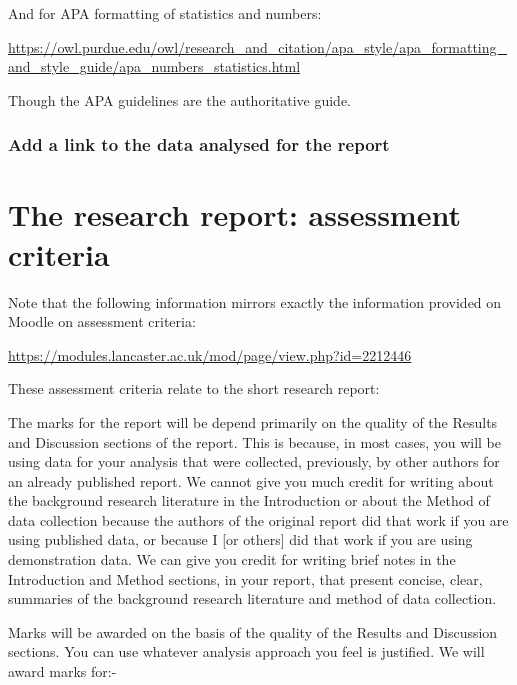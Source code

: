 \documentclass[
  letterpaper,
  DIV=11,
  numbers=noendperiod]{scrreprt}
\begin{document}
And for APA formatting of statistics and numbers:

\url{https://owl.purdue.edu/owl/research_and_citation/apa_style/apa_formatting_and_style_guide/apa_numbers_statistics.html}

Though the APA guidelines are the authoritative guide.

\hypertarget{what-link}{%
\subsubsection{Add a link to the data analysed for the
report}\label{what-link}}

\hypertarget{sec-marking}{%
\section{The research report: assessment criteria}\label{sec-marking}}

Note that the following information mirrors exactly the information
provided on Moodle on assessment criteria:

\url{https://modules.lancaster.ac.uk/mod/page/view.php?id=2212446}

These assessment criteria relate to the short research report:

The marks for the report will be depend primarily on the quality of the
Results and Discussion sections of the report. This is because, in most
cases, you will be using data for your analysis that were collected,
previously, by other authors for an already published report. We cannot
give you much credit for writing about the background research
literature in the Introduction or about the Method of data collection
because the authors of the original report did that work if you are
using published data, or because I {[}or others{]} did that work if you
are using demonstration data. We can give you credit for writing brief
notes in the Introduction and Method sections, in your report, that
present concise, clear, summaries of the background research literature
and method of data collection.

Marks will be awarded on the basis of the quality of the Results and
Discussion sections. You can use whatever analysis approach you feel is
justified. We will award marks for:-
\end{document}
